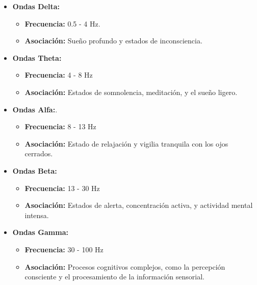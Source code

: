 \begin{itemize}

	\item
	\textbf{Ondas Delta:} 	
	\begin{itemize}
	
	\item
	\textbf{Frecuencia:} 0.5 - 4 Hz.
	\item 
	\textbf{Asociación:} Sueño profundo y estados de inconsciencia.
	\end{itemize}
	
	\item
	\textbf{Ondas Theta:}
	\begin{itemize}
	
	\item
	\textbf{Frecuencia:} 4 - 8 Hz
	\item 
	\textbf{Asociación:} Estados de somnolencia, meditación, y el sueño ligero.
	\end{itemize}
	
	\item
	\textbf{Ondas Alfa:}.
	\begin{itemize}
	
	\item
	\textbf{Frecuencia:} 8 - 13 Hz
	\item 
	\textbf{Asociación:} Estado de relajación y vigilia tranquila con los ojos cerrados.
	\end{itemize}



	\item
	\textbf{Ondas Beta:}
	\begin{itemize}
	
	\item
	\textbf{Frecuencia:} 13 - 30 Hz
	\item 
	\textbf{Asociación:} Estados de alerta, concentración activa, y actividad mental intensa.
	\end{itemize}
	
	\item
	\textbf{Ondas Gamma:}
	\begin{itemize}
	
	\item
	\textbf{Frecuencia:} 30 - 100 Hz
	\item 
	\textbf{Asociación:} Procesos cognitivos complejos, como la percepción consciente y el procesamiento de la información sensorial.
	\end{itemize}
\end{itemize}



